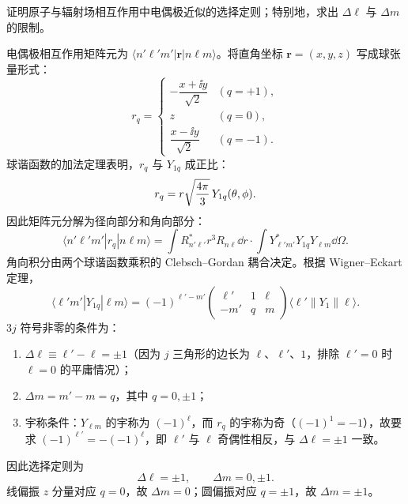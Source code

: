\begin{question}
证明原子与辐射场相互作用中电偶极近似的选择定则；特别地，求出 $\Delta \ell$ 与 $\Delta m$ 的限制。
\end{question}
\begin{solution}
电偶极相互作用矩阵元为 $\langle n'\ell' m'|\mathbf r|n\ell m\rangle$。将直角坐标 $\mathbf r=(x,y,z)$ 写成球张量形式：
\[
r_q = \begin{cases}
-\dfrac{x+\ii y}{\sqrt2} & (q=+1),\\[4pt]
z & (q=0),\\[4pt]
\dfrac{x-\ii y}{\sqrt2} & (q=-1).
\end{cases}
\]
球谐函数的加法定理表明，$r_q$ 与 $Y_{1q}$ 成正比：
\[
r_q = r\sqrt{4\pi\over3}\,Y_{1q}(\theta,\phi).
\]
因此矩阵元分解为径向部分和角向部分：
\[
\langle n'\ell' m'|r_q|n\ell m\rangle
=\int R_{n'\ell'}^* r^3 R_{n\ell}\dd r
\cdot\int Y_{\ell'm'}^* Y_{1q}Y_{\ell m}\dd\Omega.
\]
角向积分由两个球谐函数乘积的 Clebsch--Gordan 耦合决定。根据 Wigner--Eckart 定理，
\[
\langle \ell' m'|Y_{1q}|\ell m\rangle
=(-1)^{\ell'-m'}\begin{pmatrix}\ell'&1&\ell\\ -m'&q&m\end{pmatrix}
\langle\ell'\|Y_1\|\ell\rangle.
\]
$3j$ 符号非零的条件为：
\begin{enumerate}
\item $\Delta\ell\equiv\ell'-\ell=\pm1$（因为 $j$ 三角形的边长为 $\ell$、$\ell'$、$1$，排除 $\ell'=0$ 时 $\ell=0$ 的平庸情况）；
\item $\Delta m=m'-m=q$，其中 $q=0,\pm1$；
\item 宇称条件：$Y_{\ell m}$ 的宇称为 $(-1)^\ell$，而 $r_q$ 的宇称为奇（$(-1)^1=-1$），故要求 $(-1)^{\ell'}=-(-1)^\ell$，即 $\ell'$ 与 $\ell$ 奇偶性相反，与 $\Delta\ell=\pm1$ 一致。
\end{enumerate}
因此选择定则为
\[
\boxed{\Delta\ell=\pm1,\qquad\Delta m=0,\pm1.}
\]
线偏振 $z$ 分量对应 $q=0$，故 $\Delta m=0$；圆偏振对应 $q=\pm1$，故 $\Delta m=\pm1$。
\end{solution}

